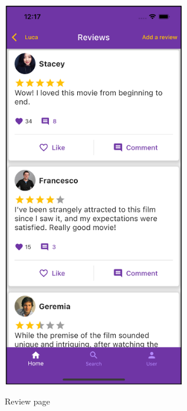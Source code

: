 \documentclass[12pt, a4paper]{article}
\numberwithin{figure}{section}
\begin{document}
\begin{center}
	\begin{minipage}[t]{0.31\textwidth}
		\begin{figure}[H]
			\centering
			\includegraphics[width=0.71\textwidth]{images/final/reviewPage.png}\\
			\caption{Review page}
		\end{figure}
	\end{minipage}
	\hspace{0.015\linewidth}
	\begin{minipage}[t]{0.31\textwidth}
		\begin{figure}[H]
			\centering

\end{figure}
\end{minipage}
\end{center}
\end{document}
